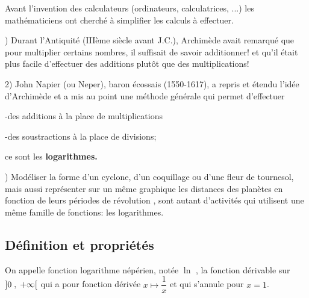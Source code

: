 


  
  
Avant l'invention des calculateurs (ordinateurs, calculatrices, ...) les mathématiciens ont cherché à simplifier les calculs à effectuer.

) Durant l'Antiquité (IIIème siècle avant J.C.), Archimède avait remarqué que pour multiplier certains nombres, il suffisait de savoir additionner! et qu'il était plus facile d'effectuer des additions plutôt que des multiplications! 

\medskip

2) John Napier (ou Neper), baron écossais (1550-1617), a repris et étendu l'idée d'Archimède et a mis au point une méthode générale qui permet d'effectuer

-des additions à la place de multiplications

-des soustractions à la place de divisions;

ce sont les \textbf{logarithmes.}

) Modéliser la forme d'un cyclone, d'un coquillage  ou d'une fleur de tournesol, mais aussi représenter sur un même graphique  les distances des planètes en fonction de leurs périodes  de révolution , sont autant d'activités qui utilisent une même famille de fonctions: les logarithmes. 
 
 \subsection{Définition et propriétés}
\begin{definition}
 On appelle fonction logarithme népérien,  notée $ \ln$ ,\; la fonction  dérivable sur $ \left]0 \;,\; +\infty\right[ $ qui a pour   fonction   dérivée \;$ x  \longmapsto \dfrac{1}{x} $ \; et  qui s'annule pour \; $ x=1 $.
\end{definition}

